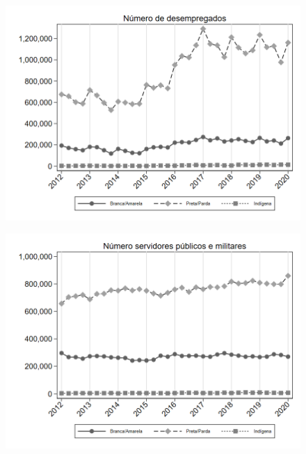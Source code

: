 \begin{frame}[label=_composicao_demografica_raca_n_de_desemprego]{}
\textit{\hyperlink{_composicao_demografica_raca}{}}
\begin{figure}
  \centering
  \includegraphics[width=1.0\linewidth]{../../analysis/output/composicao_demografica/raca/_composicao_demografica_raca_n_de_desemprego.png}
  \caption{}
  \label{fig:_composicao_demografica_raca_n_de_desemprego}
\end{figure}
\end{frame}


\begin{frame}[label=_composicao_demografica_raca_n_militar]{}
\textit{\hyperlink{_composicao_demografica_raca}{}}
\begin{figure}
  \centering
  \includegraphics[width=1.0\linewidth]{../../analysis/output/composicao_demografica/raca/_composicao_demografica_raca_n_militar.png}
  \caption{}
  \label{fig:_composicao_demografica_raca_n_militar}
\end{figure}
\end{frame}


